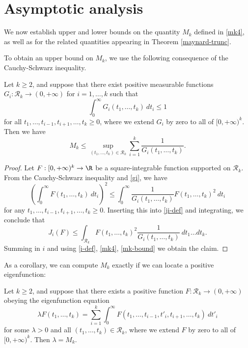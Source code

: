 \section{Asymptotic analysis}\label{asymptotics-sec}

We now establish upper and lower bounds on the quantity $M_k$ defined in \eqref{mk4}, as well as for the related quantities appearing in Theorem \ref{maynard-trunc}.

To obtain an upper bound on $M_k$, we use the following consequence of the Cauchy-Schwarz inequality.

\begin{lemma}\label{cs}  Let $k \geq 2$, and suppose that there exist positive measurable functions $G_i: {\mathcal R}_k \to (0,+\infty)$ for $i=1,\dots,k$ such that
\begin{equation}\label{gi}
 \int_0^\infty G_i(t_1,\dots,t_k)\ dt_i \leq 1
\end{equation}
for all $t_1,\dots,t_{i-1},t_{i+1},\dots,t_k \geq 0$, where we extend $G_i$ by zero to all of $[0,+\infty)^k$.  Then we have
\begin{equation}\label{mk-bound}
M_k \leq \sup_{(t_1,\dots,t_k) \in {\mathcal R}_k} \sum_{i=1}^k \frac{1}{G_i(t_1,\dots,t_k)}.
\end{equation}
\end{lemma}

\begin{proof}  Let $F: [0,+\infty)^k \to \R$ be a square-integrable function supported on ${\mathcal R}_k$.  From the Cauchy-Schwarz inequality and \eqref{gi}, we have
$$ \left(\int_0^\infty F(t_1,\dots,t_k)\ dt_i\right)^2 \leq \int_0^\infty \frac{1}{G_i(t_1,\dots,t_k)} F(t_1,\dots,t_k)^2\ dt_i$$
for any $t_1,\dots,t_{i-1},t_{i+1},\dots,t_k \geq 0$. Inserting this into \eqref{ji-def} and integrating, we conclude that
$$ J_i(F) \leq \int_{{\mathcal R}_k} F(t_1,\dots,t_k)^2 \frac{1}{G_i(t_1,\dots,t_k)}\ dt_1\dots dt_k.$$
Summing in $i$ and using \eqref{i-def}, \eqref{mk4}, \eqref{mk-bound} we obtain the claim.
\end{proof}

As a corollary, we can compute $M_k$ exactly if we can locate a positive eigenfunction:

\begin{corollary}\label{ef}  Let $k \geq 2$, and suppose that there exists a positive function $F: {\mathcal R}_k \to (0,+\infty)$ obeying the eigenfunction equation
\begin{equation}\label{lf}
 \lambda F(t_1,\dots,t_k) = \sum_{i=1}^k \int_0^\infty F(t_1,\dots,t_{i-1},t'_i, t_{i+1},\dots,t_k)\ dt'_i
\end{equation}
for some $\lambda > 0$ and all $(t_1,\dots,t_k) \in {\mathcal R}_k$, where we extend $F$ by zero to all of $[0,+\infty)^k$.  Then $\lambda = M_k$.
\end{corollary}

